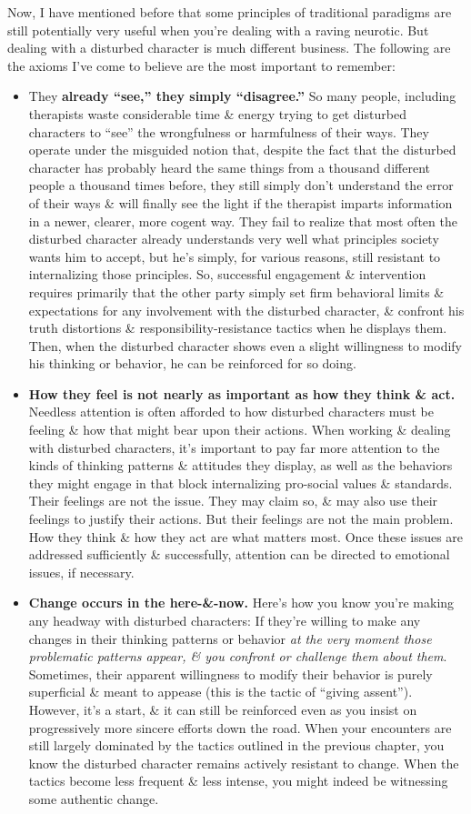 \documentclass{article}
\numberwithin{equation}{section}
\begin{document}
Now, I have mentioned before that some principles of traditional paradigms are still potentially very useful when you're dealing with a raving neurotic. But dealing with a disturbed character is much different business. The following are the axioms I've come to believe are the most important to remember:
\begin{itemize}
	\item They \textbf{already ``see,'' they simply ``disagree.''} So many people, including therapists waste considerable time \& energy trying to get disturbed characters to ``see'' the wrongfulness or harmfulness of their ways. They operate under the misguided notion that, despite the fact that the disturbed character has probably heard the same things from a thousand different people a thousand times before, they still simply don't understand the error of their ways \& will finally see the light if the therapist imparts information in a newer, clearer, more cogent way. They fail to realize that most often the disturbed character already understands very well what principles society wants him to accept, but he's simply, for various reasons, still resistant to internalizing those principles. So, successful engagement \& intervention requires primarily that the other party simply set firm behavioral limits \& expectations for any involvement with the disturbed character, \& confront his truth distortions \& responsibility-resistance tactics when he  displays them. Then, when the disturbed character shows even a slight willingness to modify his thinking or behavior, he can be reinforced for so doing.
	\item \textbf{How they feel is not nearly as important as how they think \& act.} Needless attention is often afforded to how disturbed characters must be feeling \& how that might bear upon their actions. When working \& dealing with disturbed characters, it's important to pay far more attention to the kinds of thinking patterns \& attitudes they display, as well as the behaviors they might engage in that block internalizing pro-social values \& standards. Their feelings are not the issue. They may claim so, \& may also use their feelings to justify their actions. But their feelings are not the main problem. How they think \& how they act are what matters most. Once these issues are addressed sufficiently \& successfully, attention can be directed to emotional issues, if necessary.
	\item \textbf{Change occurs in the here-\&-now.} Here's how you know you're making any headway with disturbed characters: If they're willing to make any changes in their thinking patterns or behavior \textit{at the very moment those problematic patterns appear, \& you confront or challenge them about them}. Sometimes, their apparent willingness to modify their behavior is purely superficial \& meant to appease (this is the tactic of ``giving assent''). However, it's a start, \& it can still be reinforced even as you insist on progressively more sincere efforts down the road. When your encounters are still largely dominated by the tactics outlined in the previous chapter, you know the disturbed character remains actively resistant to change. When the tactics become less frequent \& less intense, you might indeed be witnessing some authentic change.

\end{itemize}
\end{document}
